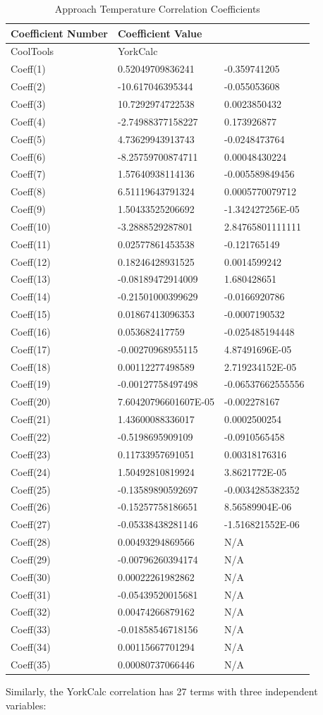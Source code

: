 \begin{longtable}[c]{@{}lll@{}}
\caption{Approach Temperature Correlation Coefficients \protect \label{table:approach-temperature-correlation-coefficients}}\\
\toprule 
Coefficient Number & Coefficient Value \tabularnewline \midrule
\endhead
CoolTools & YorkCalc \tabularnewline
Coeff(1) & 0.52049709836241 & -0.359741205 \tabularnewline
Coeff(2) & -10.617046395344 & -0.055053608 \tabularnewline
Coeff(3) & 10.7292974722538 & 0.0023850432 \tabularnewline
Coeff(4) & -2.74988377158227 & 0.173926877 \tabularnewline
Coeff(5) & 4.73629943913743 & -0.0248473764 \tabularnewline
Coeff(6) & -8.25759700874711 & 0.00048430224 \tabularnewline
Coeff(7) & 1.57640938114136 & -0.005589849456 \tabularnewline
Coeff(8) & 6.51119643791324 & 0.0005770079712 \tabularnewline
Coeff(9) & 1.50433525206692 & -1.342427256E-05 \tabularnewline
Coeff(10) & -3.2888529287801 & 2.84765801111111 \tabularnewline
Coeff(11) & 0.02577861453538 & -0.121765149 \tabularnewline
Coeff(12) & 0.18246428931525 & 0.0014599242 \tabularnewline
Coeff(13) & -0.08189472914009 & 1.680428651 \tabularnewline
Coeff(14) & -0.21501000399629 & -0.0166920786 \tabularnewline
Coeff(15) & 0.01867413096353 & -0.0007190532 \tabularnewline
Coeff(16) & 0.053682417759 & -0.025485194448 \tabularnewline
Coeff(17) & -0.00270968955115 & 4.87491696E-05 \tabularnewline
Coeff(18) & 0.00112277498589 & 2.719234152E-05 \tabularnewline
Coeff(19) & -0.00127758497498 & -0.06537662555556 \tabularnewline
Coeff(20) & 7.60420796601607E-05 & -0.002278167 \tabularnewline
Coeff(21) & 1.43600088336017 & 0.0002500254 \tabularnewline
Coeff(22) & -0.5198695909109 & -0.0910565458 \tabularnewline
Coeff(23) & 0.11733957691051 & 0.00318176316 \tabularnewline
Coeff(24) & 1.50492810819924 & 3.8621772E-05 \tabularnewline
Coeff(25) & -0.13589890592697 & -0.0034285382352 \tabularnewline
Coeff(26) & -0.15257758186651 & 8.56589904E-06 \tabularnewline
Coeff(27) & -0.05338438281146 & -1.516821552E-06 \tabularnewline
Coeff(28) & 0.00493294869566 & N/A \tabularnewline
Coeff(29) & -0.00796260394174 & N/A \tabularnewline
Coeff(30) & 0.00022261982862 & N/A \tabularnewline
Coeff(31) & -0.05439520015681 & N/A \tabularnewline
Coeff(32) & 0.00474266879162 & N/A \tabularnewline
Coeff(33) & -0.01858546718156 & N/A \tabularnewline
Coeff(34) & 0.00115667701294 & N/A \tabularnewline
Coeff(35) & 0.00080737066446 & N/A \tabularnewline
\bottomrule
\end{longtable}

Similarly, the YorkCalc correlation has 27 terms with three independent variables:

